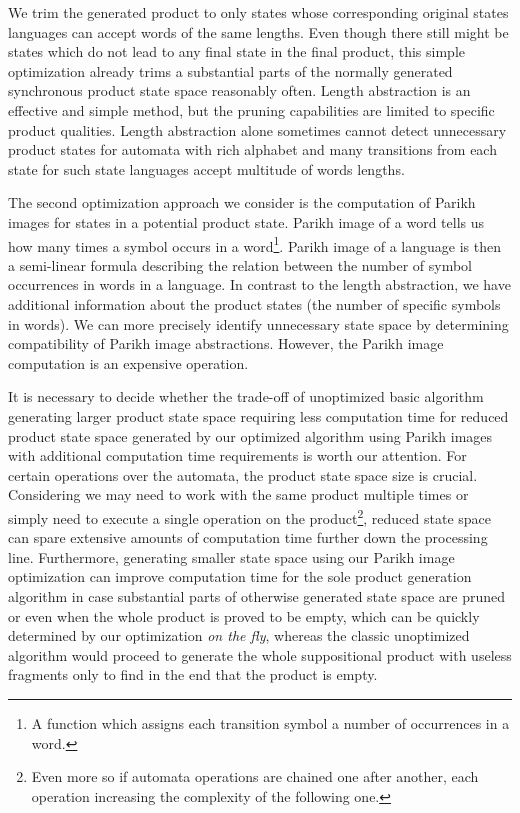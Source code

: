 We trim the generated product to only states whose corresponding original states languages can accept words of the same lengths. Even though there still might be states which do not lead to any final state in the final product, this simple optimization already trims a substantial parts of the normally generated synchronous product state space reasonably often. Length abstraction is an effective and simple method, but the pruning capabilities are limited to specific product qualities. Length abstraction alone sometimes cannot detect unnecessary product states for automata with rich alphabet and many transitions from each state for such state languages accept multitude of words lengths.



The second optimization approach we consider is the computation of Parikh images for states in a potential product state. Parikh image of a word tells us how many times a symbol occurs in a word\footnote{A function which assigns each transition symbol a number of occurrences in a word.}. Parikh image of a language is then a semi-linear formula describing the relation between the number of symbol occurrences in words in a language. In contrast to the length abstraction, we have additional information about the product states (the number of specific symbols in words). We can more precisely identify unnecessary state space by determining compatibility of Parikh image abstractions. However, the Parikh image computation is an expensive operation.

It is necessary to decide whether the trade-off of unoptimized basic algorithm generating larger product state space requiring less computation time for reduced product state space generated by our optimized algorithm using Parikh images with additional computation time requirements is worth our attention. For certain operations over the automata, the product state space size is crucial. Considering we may need to work with the same product multiple times or simply need to execute a single operation on the product\footnote{Even more so if automata operations are chained one after another, each operation increasing the complexity of the following one.}, reduced state space can spare extensive amounts of computation time further down the processing line. Furthermore, generating smaller state space using our Parikh image optimization can improve computation time for the sole product generation algorithm in case substantial parts of otherwise generated state space are pruned or even when the whole product is proved to be empty, which can be quickly determined by our optimization \emph{on the fly}, whereas the classic unoptimized algorithm would proceed to generate the whole suppositional product with useless fragments only to find in the end that the product is empty.

